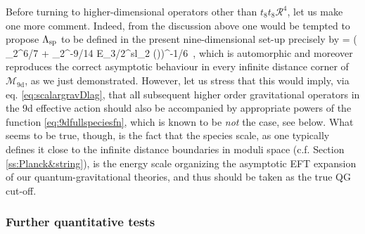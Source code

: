 Before turning to higher-dimensional operators other than $t_8 t_8 \mathcal{R}^4$, let us make one more comment. Indeed, from the discussion above one would be tempted to propose $\Lambda_{\text{sp}}$ to be defined in the present nine-dimensional set-up precisely by
%
\beq
\LSP = \left(  _2^{6/7} + _2^{-9/14} E_{3/2}^{sl_2} (\tau)\right)^{-1/6}\, ,
\label{eq:9dfullspeciesfn}
\eeq
%
which is automorphic and moreover reproduces the correct asymptotic behaviour in every infinite distance corner of $\mathcal{M}_{\text{9d}}$, as we just demonstrated. However, let us stress that this would imply, via eq. \eqref{eq:scalargravDlag}, that all subsequent higher order gravitational operators in the 9d effective action should also be accompanied by appropriate powers of the function \eqref{eq:9dfullspeciesfn}, which is known to be \emph{not} the case, see below. What seems to be true, though, is the fact that the species scale, as one typically defines it close to the infinite distance boundaries in moduli space (c.f. Section \ref{ss:Planck&string}), is the energy scale organizing the asymptotic EFT expansion of our quantum-gravitational theories, and thus should be taken as the true QG cut-off.  

%
%
\subsubsection*{Further quantitative tests}

